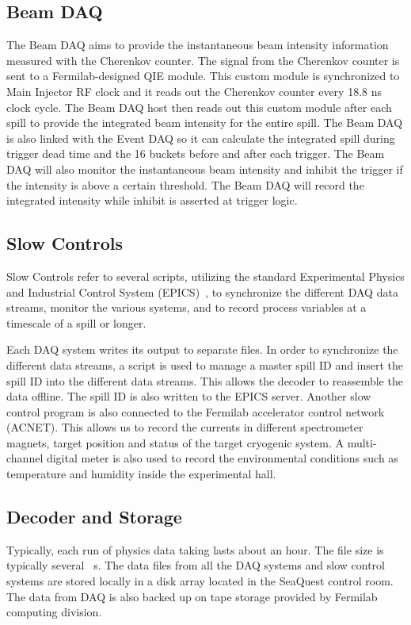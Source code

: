 \documentclass[../main.tex]{subfiles}
\begin{document}
\subsection{Beam DAQ}
\label{subsec:beamDAQ}
The Beam DAQ aims to provide the instantaneous beam intensity information measured with the Cherenkov  counter.
The signal from the Cherenkov  counter is sent to a Fermilab-designed QIE module.
This custom module is synchronized to Main Injector RF clock and it reads out the Cherenkov
counter every 18.8 ns clock cycle. The Beam DAQ host then reads out this custom module
after each spill to provide the integrated beam intensity for the entire spill.
The Beam DAQ is also linked with the Event DAQ so it can calculate the integrated spill
during trigger dead time and the 16 buckets before and after each trigger.
The Beam DAQ will also monitor the instantaneous beam intensity and inhibit the trigger if the
intensity is above a certain threshold. The Beam DAQ will record the integrated intensity
while inhibit is asserted at trigger logic.

\subsection{Slow Controls}
Slow Controls refer to several scripts, utilizing the standard Experimental Physics and Industrial Control
System (EPICS)~\cite{dalesio1994}, to synchronize the different DAQ data streams, monitor the various systems,
and to record process variables at a timescale of a spill or longer.

Each DAQ system writes its output to separate files. In order to synchronize the different data streams,
a script is used to manage a master spill ID and insert the spill ID into the different data streams.
This allows the decoder to reassemble the data offline. The spill ID is also written to the EPICS server.
Another slow control program is also connected to the Fermilab accelerator control network (ACNET).
This allows us to record the currents in different spectrometer magnets, target position
and status of the target cryogenic system. A multi-channel digital meter is also used to record
the environmental conditions such as temperature and humidity inside the experimental hall.

\subsection{Decoder and Storage}
Typically, each run of physics  data taking lasts about an hour. The file size is typically
several \unit{\giga\byte}s. The data files from all the DAQ systems and slow control systems
are stored locally in a disk array located in the SeaQuest control room. The data from DAQ
is also backed up on tape storage provided by Fermilab computing division.
\end{document}
